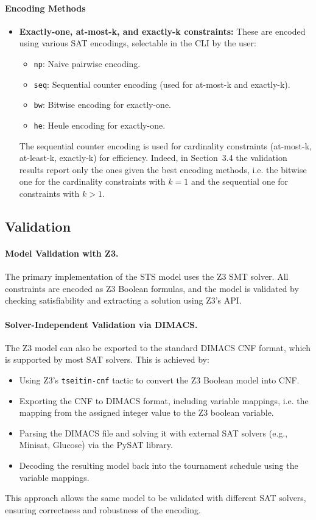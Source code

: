\documentclass[11pt]{article}
\begin{document}
\paragraph{Encoding Methods}
\begin{itemize}
    \item \textbf{Exactly-one, at-most-k, and exactly-k constraints:} These are encoded using various SAT encodings, selectable in the CLI by the user:
    \begin{itemize}
        \item \texttt{np}: Naive pairwise encoding.
        \item \texttt{seq}: Sequential counter encoding (used for at-most-k and exactly-k).
        \item \texttt{bw}: Bitwise encoding for exactly-one.
        \item \texttt{he}: Heule encoding for exactly-one.
    \end{itemize}
    The sequential counter encoding is used for cardinality constraints (at-most-k, at-least-k, exactly-k) for efficiency. Indeed, in Section~3.4 the validation results report only the ones given the best encoding methods, i.e. the bitwise one for the cardinality constraints with $k=1$ and the sequential one for constraints with $k>1$.
\end{itemize}

\subsection{Validation}

\paragraph{Model Validation with Z3.}
The primary implementation of the STS model uses the Z3 SMT solver. All constraints are encoded as Z3 Boolean formulas, and the model is validated by checking satisfiability and extracting a solution using Z3's API.

\paragraph{Solver-Independent Validation via DIMACS.} The Z3 model can also be exported to the standard DIMACS CNF format, which is supported by most SAT solvers. This is achieved by:
\begin{itemize}
    \item Using Z3's \texttt{tseitin-cnf} tactic \cite{tseitin} to convert the Z3 Boolean model into CNF.
    \item Exporting the CNF to DIMACS format, including variable mappings, i.e. the mapping from the assigned integer value to the Z3 boolean variable.
    \item Parsing the DIMACS file and solving it with external SAT solvers (e.g., Minisat, Glucose) via the PySAT library.
    \item Decoding the resulting model back into the tournament schedule using the variable mappings.
\end{itemize}
This approach allows the same model to be validated with different SAT solvers, ensuring correctness and robustness of the encoding.
\end{document}
